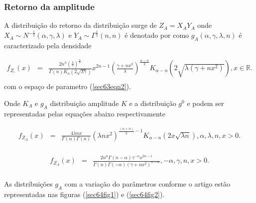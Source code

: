 \documentclass[10pt,a4paper]{article}
\begin{document}
\subsubsection{Retorno da amplitude}

A distribuição do retorno da distribuição surge de $Z_{A}=X_{A}Y_{A}$ onde $X_{A}\sim N^{-\frac{1}{2}}(\alpha,\gamma,\lambda)$  e $Y_{A}\sim\Gamma^{\frac{1}{2}}(n,n)$ é denotado por como $g_{A}(\alpha,\gamma,\lambda,n)$ é caracterizado pela densidade  

\begin{equation}\label{sec64eqn1}
\begin{array}{ccc}
	f_{Z_{\circ}}(x)&=&\frac{2n^n\left(\frac{\lambda}{\gamma}\right)^{\frac{\alpha}{2}}}{\Gamma(n)K_{\alpha}(2\sqrt{\lambda\gamma})}x^{2n-1}\left(\frac{\gamma+nx^2}{\lambda}\right)^{\frac{\alpha-n}{2}}K_{\alpha-n}(2\sqrt{\lambda(\gamma+nx^2)}), x\in\mathbb{R}. \\
\end{array}
\end{equation}
com o espaço de parametro (\ref{sec63eqn2}).

Onde $K_{A}$ e $g_{A}$  distribuição amplitude $K$ e a distribuição $g^0$ e podem ser representadas pelas equações abaixo respectivamente

\begin{equation}\label{sec64eqn2}
\begin{array}{ccc}
	f_{Z_{A}}(x)&=& \frac{4\lambda n x}{\Gamma(\alpha)\Gamma(n)}(\lambda n x^2)^{\frac{(\alpha+n)}{2}-1} K_{\alpha-n}(2x\sqrt{\lambda n}), \alpha,\lambda,n, x>0. \\
\end{array}
\end{equation}

\begin{equation}\label{sec64eqn3}
\begin{array}{ccc}
	f_{Z_{A}}(x)&=& \frac{2n^n\Gamma(n-\alpha)\gamma^{-\alpha}x^{2n-1}}{\Gamma(n)\Gamma(-\alpha)(\gamma+nx^2)^{n-\alpha}}, -\alpha,\gamma,n, x>0. \\
\end{array}
\end{equation}


As distribuições $g_A$ com a variação do parâmetros conforme o artigo estão representadas nas figuras (\ref{sec64fig1}) e (\ref{sec64fig2}).
\end{document}
